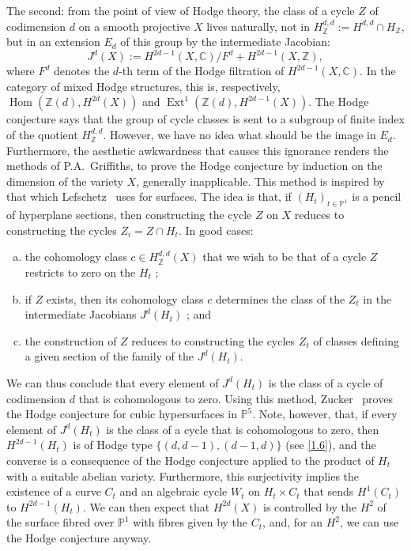 \documentclass{article}
\theoremstyle{plain}
\theoremstyle{definition}
\newcommand{\ZZ}{\mathbb{Z}}
\newcommand{\CC}{\mathbb{C}}
\newcommand{\PP}{\mathbb{P}}
\DeclareMathOperator{\Hom}{Hom}
\DeclareMathOperator{\Ext}{Ext}
\begin{document}
The second: from the point of view of Hodge theory, the class of a cycle $Z$ of codimension $d$ on a smooth projective $X$ lives naturally, not in $H_\ZZ^{d,d}:=H^{d,d}\cap H_\ZZ$, but in an extension $E_d$ of this group by the intermediate Jacobian:
\[
  J^d(X) := H^{2d-1}(X,\CC)/F^d + H^{2d-1}(X,\ZZ),
\]
where $F^d$ denotes the $d$-th term of the Hodge filtration of $H^{2d-1}(X,\CC)$.
In the category of mixed Hodge structures, this is, respectively, $\Hom(\ZZ(d),H^{2d}(X))$ and $\Ext^1(\ZZ(d),H^{2d-1}(X))$.
The Hodge conjecture says that the group of cycle classes is sent to a subgroup of finite index of the quotient $H_\ZZ^{d,d}$.
However, we have no idea what should be the image in $E_d$.
Furthermore, the aesthetic awkwardness that causes this ignorance renders the methods of P.A.~Griffiths, to prove the Hodge conjecture by induction on the dimension of the variety $X$, generally inapplicable.
This method is inspired by that which Lefschetz~\cite{24} uses for surfaces.
The idea is that, if $(H_t)_{t\in\PP^1}$ is a pencil of hyperplane sections, then constructing the cycle $Z$ on $X$ reduces to constructing the cycles $Z_i=Z\cap H_t$.
In good cases:
\begin{enumerate}[(a)]
  \item the cohomology class $c\in H_\ZZ^{d,d}(X)$ that we wish to be that of a cycle $Z$ restricts to zero on the $H_t$ ;
  \item if $Z$ exists, then its cohomology class $c$ determines the class of the $Z_t$ in the intermediate Jacobians $J^d(H_t)$ ; and
  \item the construction of $Z$ reduces to constructing the cycles $Z_t$ of classes defining a given section of the family of the $J^d(H_t)$.
\end{enumerate}
We can thus conclude that every element of $J^d(H_t)$ is the class of a cycle of codimension $d$ that is cohomologous to zero.
Using this method, Zucker~\cite{32} proves the Hodge conjecture for cubic hypersurfaces in $\PP^5$.
Note, however, that, if every element of $J^d(H_t)$ is the class of a cycle that is cohomologous to zero, then $H^{2d-1}(H_t)$ is of Hodge type $\{(d,d-1),(d-1,d)\}$ (see \cref{1.6}), and the converse is a consequence of the Hodge conjecture applied to the product of $H_t$ with a suitable abelian variety.
Furthermore, this surjectivity implies the existence of a curve $C_t$ and an algebraic cycle $W_t$ on $H_t\times C_t$ that sends $H^1(C_t)$ to $H^{2d-1}(H_t)$.
We can then expect that $H^{2d}(X)$ is controlled by the $H^2$ of the surface fibred over $\PP^1$ with fibres given by the $C_t$, and, for an $H^2$, we can use the Hodge conjecture anyway.
\end{document}
